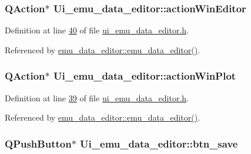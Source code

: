 \hypertarget{a00079_aa5d56420958ab4fd1239e29714d75e18}{
\subsubsection[{action\+Win\+Editor}]{\setlength{\rightskip}{0pt plus 5cm}Q\+Action$\ast$ Ui\+\_\+emu\+\_\+data\+\_\+editor\+::action\+Win\+Editor}}\label{a00079_aa5d56420958ab4fd1239e29714d75e18}


Definition at line \hyperlink{a00138_source_l00040}{40} of file \hyperlink{a00138_source}{ui\+\_\+emu\+\_\+data\+\_\+editor.\+h}.



Referenced by \hyperlink{a00093_source_l00012}{emu\+\_\+data\+\_\+editor\+::emu\+\_\+data\+\_\+editor()}.

\hypertarget{a00079_a0aeb289d8df9db6f4329e9000e44d511}{
\subsubsection[{action\+Win\+Plot}]{\setlength{\rightskip}{0pt plus 5cm}Q\+Action$\ast$ Ui\+\_\+emu\+\_\+data\+\_\+editor\+::action\+Win\+Plot}}\label{a00079_a0aeb289d8df9db6f4329e9000e44d511}


Definition at line \hyperlink{a00138_source_l00039}{39} of file \hyperlink{a00138_source}{ui\+\_\+emu\+\_\+data\+\_\+editor.\+h}.



Referenced by \hyperlink{a00093_source_l00012}{emu\+\_\+data\+\_\+editor\+::emu\+\_\+data\+\_\+editor()}.

\hypertarget{a00079_a3b0808ff0825375685673655eb4785fc}{
\subsubsection[{btn\+\_\+save}]{\setlength{\rightskip}{0pt plus 5cm}Q\+Push\+Button$\ast$ Ui\+\_\+emu\+\_\+data\+\_\+editor\+::btn\+\_\+save}}\label{a00079_a3b0808ff0825375685673655eb4785fc}


